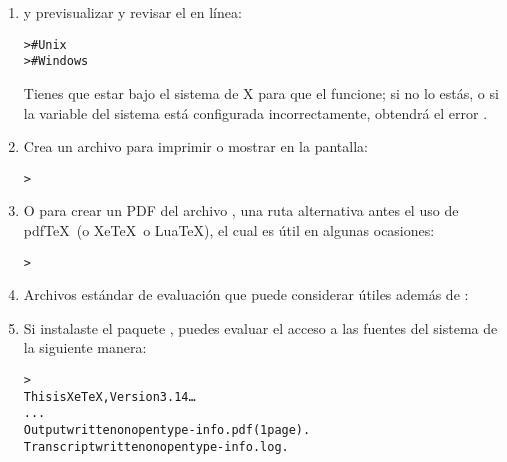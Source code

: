 \documentclass{article}
\begin{document}
\begin{enumerate}
\begin{alltt}
> 
\end{alltt}

\item y previsualizar y revisar el \dvi{} en línea:
\begin{alltt}
>     # Unix
>   # Windows
\end{alltt}

Tienes que estar bajo el sistema de X para que el 
funcione; si no lo estás, o si la variable del sistema
 está configurada incorrectamente, obtendrá el
error .

\item Crea un archivo \PS{} para imprimir o mostrar en la pantalla:
\begin{alltt}
> 
\end{alltt}

\item O para crear un PDF del archivo \dvi{}, una ruta alternativa antes el uso de pdf\TeX\ (o Xe\TeX\ o Lua\TeX), el cual es útil en algunas ocasiones:

\begin{alltt}
> 
\end{alltt}
  
\item Archivos estándar de evaluación que puede considerar útiles
	además de :

\item Si instalaste el paquete , puedes evaluar el
	acceso a las fuentes del sistema de la siguiente manera:
\begin{alltt}
> 
This is XeTeX, Version 3.14\ldots
...
Output written on opentype-info.pdf (1 page).
Transcript written on opentype-info.log.
\end{alltt}


\end{enumerate}
\end{document}
